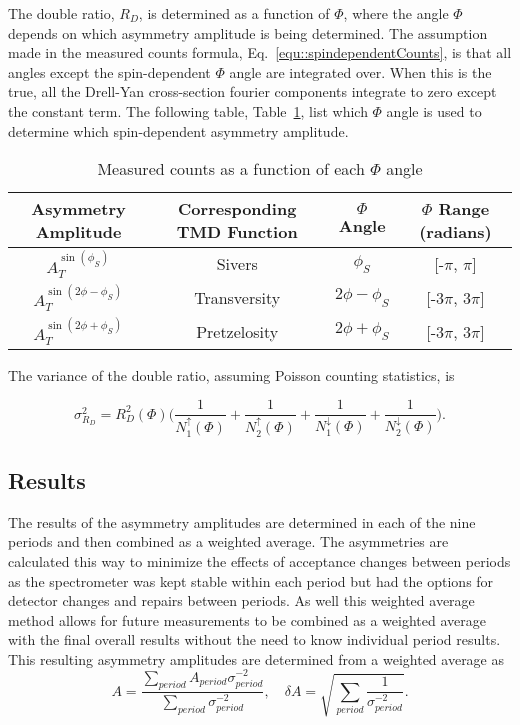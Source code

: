 The double ratio, $R_D$, is determined as a function of $\Phi$, where the angle
$\Phi$ depends on which asymmetry amplitude is being determined.  The assumption
made in the measured counts formula, Eq.~\ref{equ::spindependentCounts}, is that
all angles except the spin-dependent $\Phi$ angle are integrated over.  When
this is the true, all the Drell-Yan cross-section fourier components integrate
to zero except the constant term.  The following table,
Table~\ref{tab::ratio_phiAngles}, list which $\Phi$ angle is used to determine
which spin-dependent asymmetry amplitude.

\begin{table}[h!t]
  \centering
  \caption{Measured counts as a function of each $\Phi$ angle}
  \begin{tabular}{ |c|c|c|c| }
    \hline \textbf{Asymmetry Amplitude}& \textbf{Corresponding TMD Function}&
    \textbf{$\Phi$ Angle}& \textbf{$\Phi$ Range (radians)} \\ \hline
    
    $A^{\sin(\phi_S)}_T$& Sivers& $\phi_S$& [-$\pi$, $\pi$] \\ \hline

    $A^{\sin(2\phi-\phi_S)}_T$& Transversity& $2\phi-\phi_S$& [-3$\pi$, 3$\pi$]
    \\ \hline

    $A^{\sin(2\phi+\phi_S)}_T$& Pretzelosity& $2\phi+\phi_S$& [-3$\pi$, 3$\pi$]
    \\ \hline
  \end{tabular}
    \label{tab::ratio_phiAngles}
\end{table}

The variance of the double ratio, assuming Poisson counting statistics, is

\begin{equation}
  \sigma^2_{R_D} = R^2_D(\Phi)\Big(\frac{1}{N_1^\uparrow(\Phi)}
    + \frac{1}{N_2^\uparrow(\Phi)}
    + \frac{1}{N_1^\downarrow(\Phi)}
    +\frac{1}{N_2^\downarrow(\Phi)}
   \Big).
\end{equation}

\subsection{Results}\label{sec::doubleratio_results}
The results of the asymmetry amplitudes are determined in each of the nine
periods and then combined as a weighted average.  The asymmetries are calculated
this way to minimize the effects of acceptance changes between periods as the
spectrometer was kept stable within each period but had the options for detector
changes and repairs between periods.  As well this weighted average method
allows for future measurements to be combined as a weighted average with the
final overall results without the need to know individual period results.  This
resulting asymmetry amplitudes are determined from a weighted average as
\begin{equation}
  \label{equ::wAvg}
  A = \frac{
    \sum_{period}
  A_{period}\sigma^{-2}_{period}
  }{
    \sum_{period} \sigma^{-2}_{period}
    },
  \quad \delta A = \sqrt{\sum_{period}
  \frac{1}{\sigma^{-2}_{period}}}.
\end{equation}

